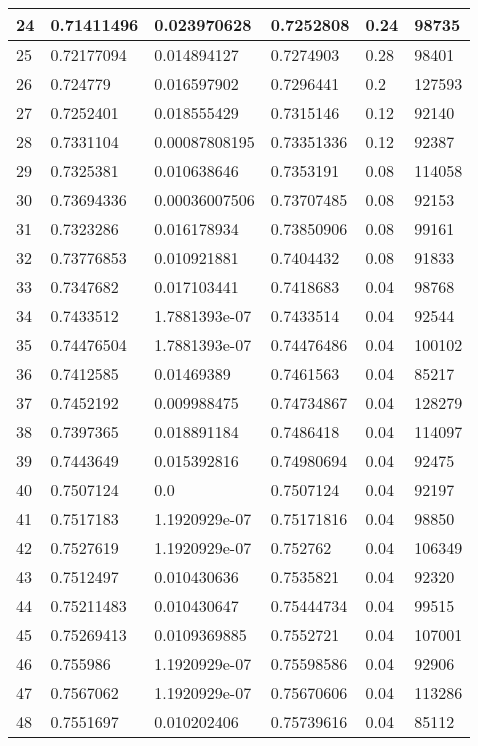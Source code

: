 \begin{longtable}{|l|l|l|l|l|l|}
24 & 0.71411496 & 0.023970628 & 0.7252808 & 0.24 & 98735 \\ \hline 
25 & 0.72177094 & 0.014894127 & 0.7274903 & 0.28 & 98401 \\ \hline 
26 & 0.724779 & 0.016597902 & 0.7296441 & 0.2 & 127593 \\ \hline 
27 & 0.7252401 & 0.018555429 & 0.7315146 & 0.12 & 92140 \\ \hline 
28 & 0.7331104 & 0.00087808195 & 0.73351336 & 0.12 & 92387 \\ \hline 
29 & 0.7325381 & 0.010638646 & 0.7353191 & 0.08 & 114058 \\ \hline 
30 & 0.73694336 & 0.00036007506 & 0.73707485 & 0.08 & 92153 \\ \hline 
31 & 0.7323286 & 0.016178934 & 0.73850906 & 0.08 & 99161 \\ \hline 
32 & 0.73776853 & 0.010921881 & 0.7404432 & 0.08 & 91833 \\ \hline 
33 & 0.7347682 & 0.017103441 & 0.7418683 & 0.04 & 98768 \\ \hline 
34 & 0.7433512 & 1.7881393e-07 & 0.7433514 & 0.04 & 92544 \\ \hline 
35 & 0.74476504 & 1.7881393e-07 & 0.74476486 & 0.04 & 100102 \\ \hline 
36 & 0.7412585 & 0.01469389 & 0.7461563 & 0.04 & 85217 \\ \hline 
37 & 0.7452192 & 0.009988475 & 0.74734867 & 0.04 & 128279 \\ \hline 
38 & 0.7397365 & 0.018891184 & 0.7486418 & 0.04 & 114097 \\ \hline 
39 & 0.7443649 & 0.015392816 & 0.74980694 & 0.04 & 92475 \\ \hline 
40 & 0.7507124 & 0.0 & 0.7507124 & 0.04 & 92197 \\ \hline 
41 & 0.7517183 & 1.1920929e-07 & 0.75171816 & 0.04 & 98850 \\ \hline 
42 & 0.7527619 & 1.1920929e-07 & 0.752762 & 0.04 & 106349 \\ \hline 
43 & 0.7512497 & 0.010430636 & 0.7535821 & 0.04 & 92320 \\ \hline 
44 & 0.75211483 & 0.010430647 & 0.75444734 & 0.04 & 99515 \\ \hline 
45 & 0.75269413 & 0.0109369885 & 0.7552721 & 0.04 & 107001 \\ \hline 
46 & 0.755986 & 1.1920929e-07 & 0.75598586 & 0.04 & 92906 \\ \hline 
47 & 0.7567062 & 1.1920929e-07 & 0.75670606 & 0.04 & 113286 \\ \hline 
48 & 0.7551697 & 0.010202406 & 0.75739616 & 0.04 & 85112 \\ \hline 

\end{longtable}
